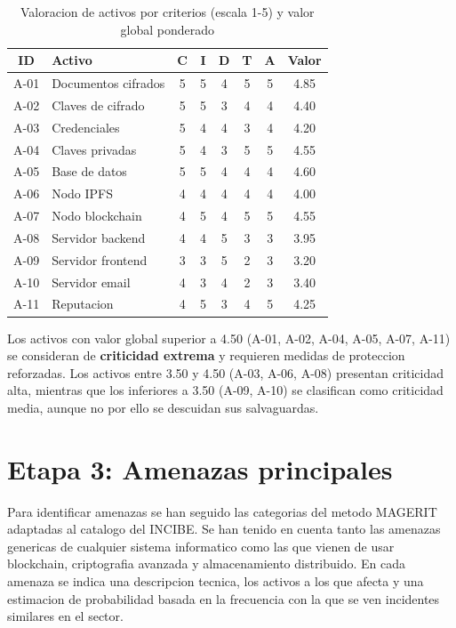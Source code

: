 \documentclass[11pt, a4paper]{article}
\begin{document}
\begin{table}[H]
\centering
\renewcommand{\arraystretch}{1.4}
\small
\begin{tabular}{|c|l|c|c|c|c|c|c|}
\hline
\textbf{ID} & \textbf{Activo} & \textbf{C} & \textbf{I} & \textbf{D} & \textbf{T} & \textbf{A} & \textbf{Valor} \\
\hline
A-01 & Documentos cifrados & 5 & 5 & 4 & 5 & 5 & 4.85 \\
\hline
A-02 & Claves de cifrado & 5 & 5 & 3 & 4 & 4 & 4.40 \\
\hline
A-03 & Credenciales & 5 & 4 & 4 & 3 & 4 & 4.20 \\
\hline
A-04 & Claves privadas & 5 & 4 & 3 & 5 & 5 & 4.55 \\
\hline
A-05 & Base de datos & 5 & 5 & 4 & 4 & 4 & 4.60 \\
\hline
A-06 & Nodo IPFS & 4 & 4 & 4 & 4 & 4 & 4.00 \\
\hline
A-07 & Nodo blockchain & 4 & 5 & 4 & 5 & 5 & 4.55 \\
\hline
A-08 & Servidor backend & 4 & 4 & 5 & 3 & 3 & 3.95 \\
\hline
A-09 & Servidor frontend & 3 & 3 & 5 & 2 & 3 & 3.20 \\
\hline
A-10 & Servidor email & 4 & 3 & 4 & 2 & 3 & 3.40 \\
\hline
A-11 & Reputacion & 4 & 5 & 3 & 4 & 5 & 4.25 \\
\hline
\end{tabular}
\caption{Valoracion de activos por criterios (escala 1-5) y valor global ponderado}
\label{tab:valoracion}
\end{table}

Los activos con valor global superior a 4.50 (A-01, A-02, A-04, A-05, A-07, A-11) se consideran de \textbf{criticidad extrema} y requieren medidas de proteccion reforzadas. Los activos entre 3.50 y 4.50 (A-03, A-06, A-08) presentan criticidad alta, mientras que los inferiores a 3.50 (A-09, A-10) se clasifican como criticidad media, aunque no por ello se descuidan sus salvaguardas.

\section{Etapa 3: Amenazas principales}

Para identificar amenazas se han seguido las categorias del metodo MAGERIT adaptadas al catalogo del INCIBE. Se han tenido en cuenta tanto las amenazas genericas de cualquier sistema informatico como las que vienen de usar blockchain, criptografia avanzada y almacenamiento distribuido. En cada amenaza se indica una descripcion tecnica, los activos a los que afecta y una estimacion de probabilidad basada en la frecuencia con la que se ven incidentes similares en el sector.
\end{document}
